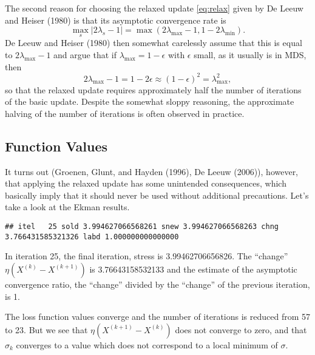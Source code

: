 \documentclass[
  12pt,
]{article}
\begin{document}
The second reason for choosing the relaxed update \eqref{eq:relax} given by De Leeuw and Heiser (1980)
is that its asymptotic convergence rate is
\begin{equation}
\max_s|2\lambda_s-1|=\max(2\lambda_{\text{max}}-1,1-2\lambda_{\text{min}}).
\end{equation}
De Leeuw and Heiser (1980) then somewhat carelessly assume that this is equal to
\(2\lambda_{\text{max}}-1\) and argue that if \(\lambda_{\text{max}}=1-\epsilon\)
with \(\epsilon\) small, as it usually is in MDS, then
\begin{equation}
2\lambda_{\text{max}}-1=1-2\epsilon\approx(1-\epsilon)^2=\lambda_{\text{max}}^2,
\end{equation}
so that the relaxed update requires approximately half the number of iterations of the
basic update. Despite the somewhat sloppy reasoning, the approximate halving of the number of iterations is often observed in practice.

\subsection{Function Values}\label{function-values-4}

It turns out (Groenen, Glunt, and Hayden (1996), De Leeuw (2006)), however, that applying the relaxed update
has some unintended consequences, which basically imply that it should never
be used without additional precautions. Let's take a look at the
Ekman results.

\begin{verbatim}
## itel   25 sold 3.994627066568261 snew 3.994627066568263 chng 3.766431585321326 labd 1.000000000000000
\end{verbatim}

In iteration 25, the final iteration, stress is 3.99462706656826. The ``change'' \(\eta(X^{(k)}-X^{(k+1)})\) is 3.76643158532133 and the estimate
of the asymptotic convergence ratio, the ``change'' divided by the ``change'' of the
previous iteration, is 1.

The loss function values converge and the number of iterations is reduced from 57 to 23.
But we see that \(\eta(X^{(k+1)}-X^{(k)})\) does not converge to zero, and that \(\sigma_k\) converges to a value which does not correspond to a local minimum of \(\sigma\).
\end{document}

